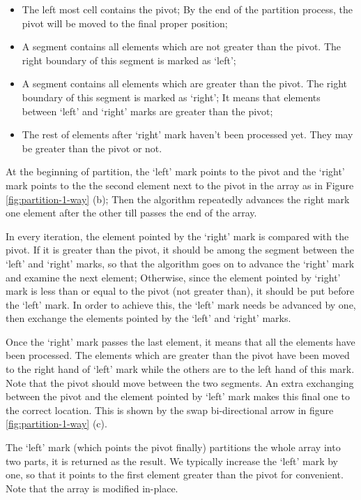 \documentclass[UTF8]{article}
\begin{document}
\begin{itemize}
\item The left most cell contains the pivot; By the end of the partition process, the pivot will be moved to the
final proper position;
\item A segment contains all elements which are not greater than the pivot. The right boundary of this segment is
marked as `left';
\item A segment contains all elements which are greater than the pivot. The right boundary of this segment is marked
as `right'; It means that elements between `left' and `right' marks are greater than the pivot;
\item The rest of elements after `right' mark haven't been processed yet. They may be greater than the
pivot or not.
\end{itemize}

At the beginning of partition, the `left' mark points to the pivot and the `right' mark points to the
the second element next to the pivot in the array as in Figure
\ref{fig:partition-1-way} (b); Then the algorithm repeatedly advances the right mark one element after the other
till passes the end of the array.

In every iteration, the element pointed by the `right' mark is compared with the
pivot. If it is greater than the pivot, it should be among the segment between the `left' and `right' marks, so that
the algorithm goes on to advance the `right' mark and examine the next element; Otherwise, since the element pointed
by `right' mark is less than or equal to the pivot (not greater than), it should be put before the `left' mark.
In order to achieve this, the `left' mark needs be advanced by one, then exchange the elements pointed by the `left'
and `right' marks.

Once the `right' mark passes the last element, it means that all the elements have been processed. The elements
which are greater than the pivot have been moved to the right hand of `left' mark while the others are to the
left hand of this mark. Note that the pivot should move between the two segments. An extra exchanging between the pivot and
the element pointed by `left' mark makes this final one to the correct location. This is shown by the swap
bi-directional arrow in figure \ref{fig:partition-1-way} (c).

The `left' mark (which points the pivot finally) partitions the whole array into two parts, it is
returned as the result. We typically increase the `left' mark by one, so that it points to the
first element greater than the pivot for convenient. Note that the array is modified in-place.
\end{document}
